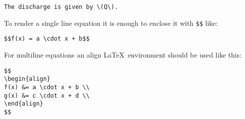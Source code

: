 \begin{lstlisting}
The discharge is given by \(Q\).
\end{lstlisting}

To render a single line equation it is enough to enclose it with \verb+$$+ like:

\begin{lstlisting}
$$f(x) = a \cdot x + b$$
\end{lstlisting}

For multiline equations an align \LaTeX\ environment should be used like this:

\begin{lstlisting}
$$
\begin{align}
f(x) &= a \cdot x + b \\
g(x) &= c \cdot x + d \\
\end{align}
$$
\end{lstlisting}
